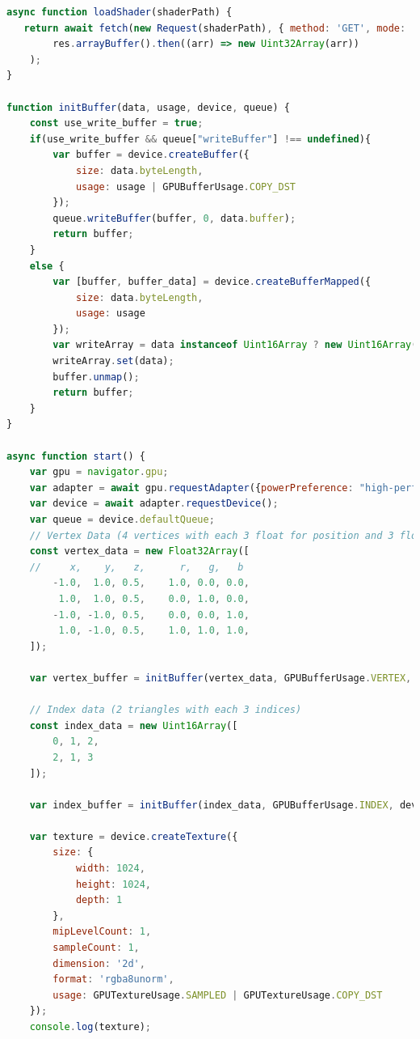 \documentclass[oneside]{ausarbeitung}
\begin{document}
\begin{lstlisting}[language=JavaScript, label={lst:js_full}, caption={Kompletter JavaScript-Quellcode für das Minimalbeispiel aus Kapitel \ref{cha:example}}]
async function loadShader(shaderPath) {
   return await fetch(new Request(shaderPath), { method: 'GET', mode: 'cors' }).then((res) =>
        res.arrayBuffer().then((arr) => new Uint32Array(arr))
    );
}

function initBuffer(data, usage, device, queue) {
    const use_write_buffer = true;
    if(use_write_buffer && queue["writeBuffer"] !== undefined){
        var buffer = device.createBuffer({
            size: data.byteLength,
            usage: usage | GPUBufferUsage.COPY_DST
        });
        queue.writeBuffer(buffer, 0, data.buffer);
        return buffer;
    }
    else {
        var [buffer, buffer_data] = device.createBufferMapped({
            size: data.byteLength,
            usage: usage
        });
        var writeArray = data instanceof Uint16Array ? new Uint16Array(buffer_data) : new Float32Array(buffer_data);
        writeArray.set(data);
        buffer.unmap();
        return buffer;
    }
}

async function start() {
    var gpu = navigator.gpu;
    var adapter = await gpu.requestAdapter({powerPreference: "high-performance"});
    var device = await adapter.requestDevice();
    var queue = device.defaultQueue;
    // Vertex Data (4 vertices with each 3 float for position and 3 float for color)
    const vertex_data = new Float32Array([
    //     x,    y,   z,      r,   g,   b
        -1.0,  1.0, 0.5,    1.0, 0.0, 0.0,
         1.0,  1.0, 0.5,    0.0, 1.0, 0.0,
        -1.0, -1.0, 0.5,    0.0, 0.0, 1.0,
         1.0, -1.0, 0.5,    1.0, 1.0, 1.0,
    ]);

    var vertex_buffer = initBuffer(vertex_data, GPUBufferUsage.VERTEX, device, queue);

    // Index data (2 triangles with each 3 indices)
    const index_data = new Uint16Array([
        0, 1, 2, 
        2, 1, 3
    ]);

    var index_buffer = initBuffer(index_data, GPUBufferUsage.INDEX, device, queue);

    var texture = device.createTexture({
        size: {
            width: 1024,
            height: 1024,
            depth: 1
        },
        mipLevelCount: 1,
        sampleCount: 1,
        dimension: '2d',
        format: 'rgba8unorm',
        usage: GPUTextureUsage.SAMPLED | GPUTextureUsage.COPY_DST
    });
    console.log(texture);


\end{lstlisting}
\end{document}
